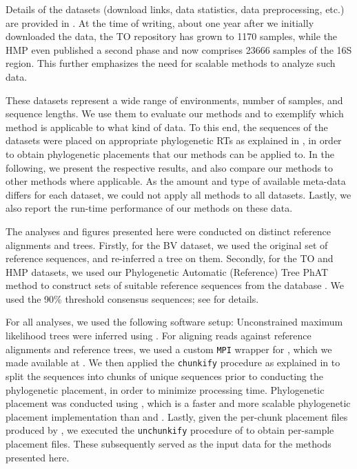 Details of the datasets (download links, data statistics, data preprocessing, etc.)
are provided in . %
At the time of writing, about one year after we initially downloaded the data,
the \ac{TO} repository has grown to \num{1 170} samples,
while the \ac{HMP} even published a second phase and now comprises \num{23 666} samples of the 16S region.
This further emphasizes the need for scalable methods to analyze such data.

These datasets represent a wide range of environments, number of samples, and sequence lengths.
We use them to evaluate our methods and to exemplify which method is applicable to what kind of data.
To this end, the sequences of the datasets were placed on appropriate phylogenetic \acp{RT} as explained
in , in order to obtain phylogenetic placements that our methods can be applied to.
In the following, we present the respective results, and also compare our methods to other methods
where applicable.
As the amount and type of available meta-data differs for each dataset,
we could not apply all methods to all datasets.
Lastly, we also report the run-time performance of our methods on these data.

The analyses and figures presented here were conducted on distinct reference alignments and trees.
Firstly, for the \ac{BV} dataset, we used the original set of reference sequences, and re-inferred a tree on them.
Secondly, for the \ac{TO} and \ac{HMP} datasets, we used our Phylogenetic Automatic (Reference) Tree \ac{PhAT} method \cite{Czech2018}
to construct sets of suitable reference sequences from the  database \cite{Quast2013,Yilmaz2014}.
We used the 90\% threshold consensus sequences;
see \cite{Czech2018} for details.

For all analyses, we used the following software setup:
Unconstrained maximum likelihood trees were inferred using  \cite{Stamatakis2014}.
For aligning reads against reference alignments and reference trees,
we used a custom \texttt{\acs{MPI}} wrapper for  \cite{Berger2011a,Berger2012},
which we made available at \cite{PaPaRaMPI}.
We then applied the \texttt{chunkify} procedure as explained in \cite{Czech2018}
to split the sequences into chunks of unique sequences prior to conducting the phylogenetic placement,
in order to minimize processing time.
Phylogenetic placement was conducted using  \cite{Barbera2018},
which is a faster and more scalable phylogenetic placement implementation
than  \cite{Berger2011} and  \cite{Matsen2010}.
Lastly, given the per-chunk placement files produced by , we executed the \texttt{unchunkify} procedure of \cite{Czech2018}
to obtain per-sample placement files. These subsequently served as the input data for the methods presented here.

